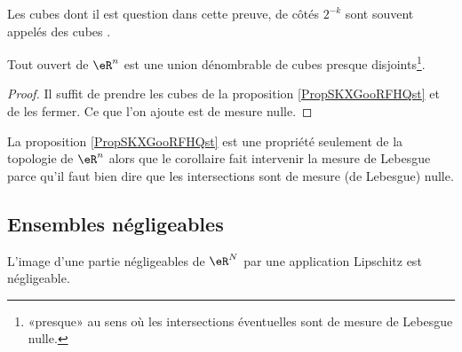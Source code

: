 Les cubes dont il est question dans cette preuve, de côtés \( 2^{-k}\) sont souvent appelés des cubes .

\begin{corollary}     \label{CorTHDQooWMSbJe}
    Tout ouvert de \( \eR^n\) est une union dénombrable de cubes presque disjoints\footnote{«presque» au sens où les intersections éventuelles sont de mesure de Lebesgue nulle.}.
\end{corollary}

\begin{proof}
    Il suffit de prendre les cubes de la proposition \ref{PropSKXGooRFHQst} et de les fermer. Ce que l'on ajoute est de mesure nulle.
\end{proof}

\begin{remark}
    La proposition \ref{PropSKXGooRFHQst} est une propriété seulement de la topologie de \( \eR^n\) alors que le corollaire fait intervenir la mesure de Lebesgue parce qu'il faut bien dire que les intersections sont de mesure (de Lebesgue) nulle.
\end{remark}

\subsection{Ensembles négligeables}

\begin{lemma}      \label{LemWHKJooGPuxEN}
    L'image d'une partie négligeables de \( \eR^N\) par une application Lipschitz est négligeable.
\end{lemma}


